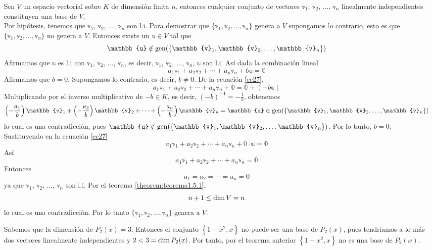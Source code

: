 \begin{theorem}\label{def:n_vectores_base}
    Sea $V$ un espacio vectorial sobre $K$ de dimensión finita $n$, entonces cualquier conjunto de vectores $\mathbb{v}_1$, $\mathbb{v}_2$, $\dots$, $\mathbb{v}_n$ linealmente independientes constituyen una base de $V$. \\
    \demostracion Por hipótesis, tenemos que $\mathbb{v}_1$, $\mathbb{v}_2$, $\dots$, $\mathbb{v}_n$ son l.i. Para demostrar que $\{ \mathbb{v}_1, \mathbb{v}_2, \dots, \mathbb{v}_n \}$ genera a $V$ supongamos lo contrario, esto es que $\{ \mathbb{v}_1, \mathbb{v}_2, \dots, \mathbb{v}_n \}$ no genera a $V$. Entonces existe un $\mathbb{u} \in V$ tal que
    $$\mathbb{u} \notin \Gen(\{ \mathbb{v}_1, \mathbb{v}_2, \dots, \mathbb{v}_n \})$$
    Afirmamos que $\mathbb{u}$ es l.i con $\mathbb{v}_1$, $\mathbb{v}_2$, $\dots$, $\mathbb{v}_n$, es decir, $\mathbb{v}_1$, $\mathbb{v}_2$, $\dots$, $\mathbb{v}_n$, $\mathbb{u}$ son l.i. Así dada la combinación lineal
    \begin{equation}
        a_1\mathbb{v}_1 + a_2\mathbb{v}_2 + \cdots + a_n\mathbb{v}_n + b\mathbb{u} = \mathbb{0} \label{ec27}
    \end{equation}
    Afirmamos que $b = 0$. Supongamos lo contrario, es decir, $b \neq 0$. De la ecuación \eqref{ec27},
    $$a_1\mathbb{v}_1 + a_2\mathbb{v}_2 + \cdots + a_n\mathbb{v}_n + \mathbb{0} = \mathbb{0} + (-b\mathbb{u})$$
    Multiplicando por el inverso multiplicativo de $-b \in K$, es decir, $\displaystyle (-b)^{-1} = - \frac{1}{b}$, obtenemos
    $$\left(-\frac{a_1}{b}\right)\mathbb{v}_1 + \left(-\frac{a_2}{b}\right)\mathbb{v}_2 + \cdots + \left(-\frac{a_n}{b}\right)\mathbb{v}_n = \mathbb{u} \in \Gen(\{ \mathbb{v}_1, \mathbb{v}_2, \dots, \mathbb{v}_n \})$$
    lo cual es una contradicción, pues $\mathbb{u} \notin \Gen(\{ \mathbb{v}_1, \mathbb{v}_2, \dots, \mathbb{v}_n \})$. Por lo tanto, $b = 0$. Sustituyendo en la ecuación \eqref{ec27}
    $$a_1\mathbb{v}_1 + a_2\mathbb{v}_2 + \cdots + a_n\mathbb{v}_n + 0 \cdot \mathbb{u} = \mathbb{0}$$
    Así
    $$a_1\mathbb{v}_1 + a_2\mathbb{v}_2 + \cdots + a_n\mathbb{v}_n = \mathbb{0}$$
    Entonces
    $$a_1 = a_2 = \cdots = a_n = 0$$
    ya que $\mathbb{v}_1$, $\mathbb{v}_2$, $\dots$, $\mathbb{v}_n$ son l.i. Por el teorema \ref{theorem:teorema1.5.1},
    $$n + 1 \leq \operatorname{dim} V = n$$
    lo cual es una contradicción. Por lo tanto $\{ \mathbb{v}_1,  \mathbb{v}_2,  \dots,  \mathbb{v}_n \}$ genera a $V$.
\end{theorem}

\begin{example}
    Sabemos que la dimensión de $P_2(x) = 3$. Entonces el conjunto $\left\{ 1-x^2,  x \right\}$ no puede ser una base de $P_2(x)$, pues tendríamos a lo más dos vectores linealmente independientes y $2 < 3 = \operatorname{dim} P_2(x)$. Por tanto, por el teorema anterior $\left\{ 1-x^2,  x \right\}$ no es una base de $P_2(x)$.
\end{example}

